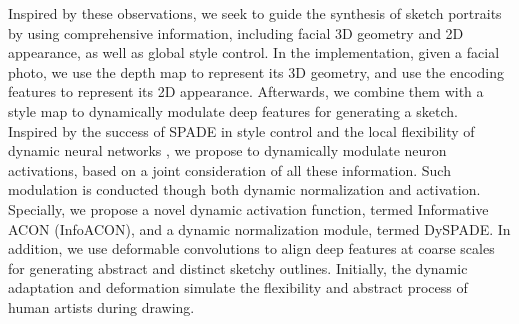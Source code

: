 \documentclass[10pt,twocolumn,letterpaper]{article}
\begin{document}
Inspired by these observations, we seek to guide the synthesis of sketch portraits by using comprehensive information, including facial 3D geometry and 2D appearance, as well as global style control.  
In the implementation, given a facial photo, we use the depth map to represent its 3D geometry, and use the encoding features to represent its 2D appearance. Afterwards, we combine them with a style map to dynamically modulate deep features for generating a sketch. 
Inspired by the success of SPADE \cite{Park2019GauGAN} in style control \cite{cocosnet} and the local flexibility of dynamic neural networks \cite{han2021dynamic}, we propose to dynamically modulate neuron activations, based on a joint consideration of all these information. 
Such modulation is conducted though both dynamic normalization and activation. 
Specially, we propose a novel dynamic activation function, termed Informative ACON (InfoACON), and a dynamic normalization module, termed DySPADE. 
In addition, we use deformable convolutions \cite{Dai2017Deformable} to align deep features \cite{FaPN2021ICCV} at coarse scales for generating abstract and distinct sketchy outlines. 
Initially, the dynamic adaptation and deformation simulate the flexibility and abstract process of human artists during drawing.

\end{document}
